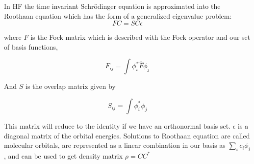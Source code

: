 \documentclass[twoside]{article}
\begin{document}
In HF the time invariant Schr\"{o}dinger equation is approximated into the Roothaan equation which has the form of a generalized eigenvalue problem:
\[
FC = SC\epsilon
\]



where $F$ is the Fock matrix which is described with the Fock operator and our set of basis functions,

\[
F_{ij} = \int \phi_i^*\hat{F}\phi_j
\]

And $S$ is the overlap matrix given by

\[
S_{ij} = \int \phi_i^*\phi_j
\]




This matrix will reduce to the identity if we have an orthonormal basis set. $\epsilon$ is a diagonal matrix of the orbital energies. 
Solutions to Roothaan equation are called molecular orbitals, are represented as a linear combination in our basis as $\sum_i c_{i}\phi_i$, and can be used to get density matrix $\rho = CC^*$ 








\end{document}
